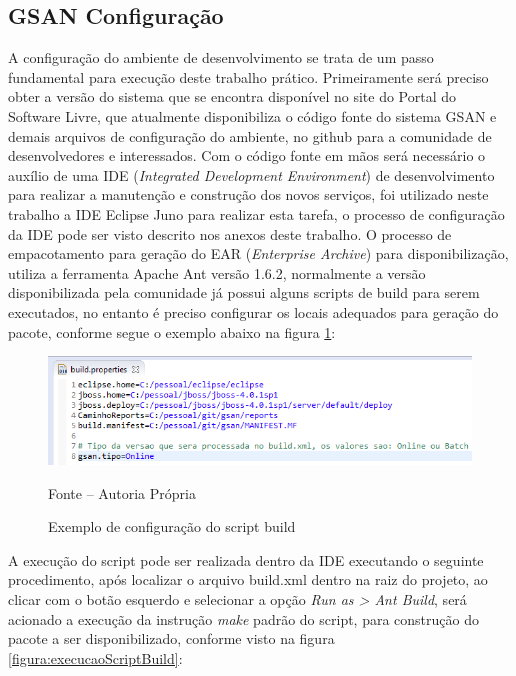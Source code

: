 \subsection{GSAN Configuração}
A configuração do ambiente de desenvolvimento se trata de um passo fundamental para execução deste trabalho prático. Primeiramente será preciso obter a versão do sistema que se encontra disponível no site do Portal do Software Livre, que atualmente disponibiliza o código fonte do sistema GSAN e demais arquivos de configuração do ambiente, no github para a comunidade de desenvolvedores e interessados.  Com o código fonte em mãos será necessário o auxílio de uma IDE (\textit{Integrated Development Environment}) de desenvolvimento para realizar a manutenção e construção dos novos serviços, foi utilizado neste trabalho a IDE Eclipse Juno para realizar esta tarefa, o processo de configuração da IDE pode ser visto descrito nos anexos deste trabalho.
O processo de empacotamento para geração do EAR (\textit{Enterprise Archive}) para disponibilização, utiliza a ferramenta Apache Ant versão 1.6.2, normalmente a versão disponibilizada pela comunidade já possui alguns scripts de build para serem executados, no entanto é preciso configurar os locais adequados para geração do pacote, conforme segue o exemplo abaixo na figura \ref{figura:configuracaoScriptBuild}:


\begin{figure}[!htb]
	\centering
	\includegraphics{figuras/build_properties.png}
	\caption{Exemplo de configuração do script build}
	\label{figura:configuracaoScriptBuild}	
	Fonte – Autoria Própria
\end{figure}
	
A execução do script pode ser realizada dentro da IDE executando o seguinte procedimento, após localizar o arquivo build.xml dentro na raiz do projeto, ao clicar com o botão esquerdo e selecionar a opção \textit{Run as > Ant Build}, será acionado a execução da instrução \textit{make} padrão do script, para construção do pacote a ser disponibilizado, conforme visto na figura \ref{figura:execucaoScriptBuild}:	
		
